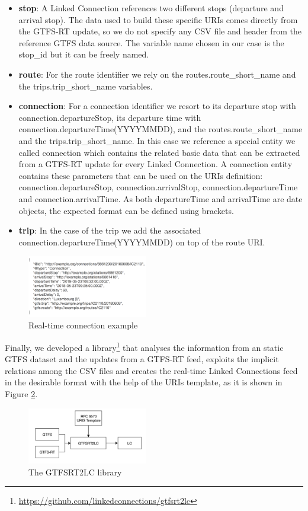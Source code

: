 \documentclass[sw]{iosart2x}
\begin{document}
\begin{itemize}
\item \textbf{stop}: A Linked Connection references two different stops (departure and arrival stop). The data used to build these specific URIs comes directly from the GTFS-RT update, so we do not specify any CSV file and header from the reference GTFS data source. The variable name chosen in our case is the stop\_id but it can be freely named.
\item \textbf{route}: For the route identifier we rely on the routes.route\_short\_name and the trips.trip\_short\_name variables.
\item \textbf{connection}:  For a connection identifier we resort to its departure stop with connection.departureStop, its departure time with connection.departureTime(YYYYMMDD), and the routes.route\_short\_name and the trips.trip\_short\_name. In this case we reference a special entity we called connection which contains the related basic data that can be extracted from a GTFS-RT update for every Linked Connection. A connection entity contains these parameters that can be used on the URIs definition: connection.departureStop, connection.arrivalStop, connection.departureTime and connection.arrivalTime. As both departureTime and arrivalTime are date objects, the expected format can be defined using brackets.
\item \textbf{trip}: In the case of the trip we add the associated connection.departureTime(YYYYMMDD) on top of the route URI.
\end{itemize}

\begin{figure}[t]
	\includegraphics[width=0.47\textwidth]{images/example_connection_rt.png}
	\caption{Real-time connection example}\label{fig:connection_rt}
\end{figure}

Finally, we developed a library\footnote{\url{https://github.com/linkedconnections/gtfsrt2lc}} that analyses the information from an static GTFS dataset and the updates from a GTFS-RT feed, exploits the implicit relations among the CSV files and creates the real-time Linked Connections feed in the desirable format with the help of the URIs template, as it is shown in Figure \ref{fig:gtfsrt2lc}.
\begin{figure}[t]
	\includegraphics[width=0.47\textwidth]{images/gtfsrt2lc.png}
	\caption{The GTFSRT2LC library}\label{fig:gtfsrt2lc}
\end{figure}
\end{document}
